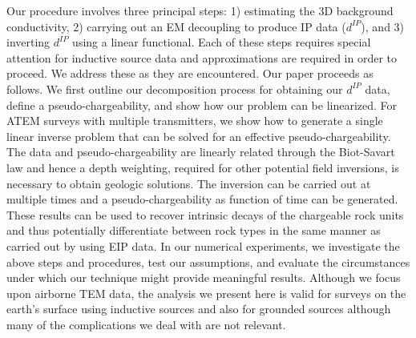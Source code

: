 \documentclass[a4paper, 11pt]{article}
\newcommand{\dip}{d^{IP}}
\begin{document}
Our procedure involves three principal steps: 1) estimating the 3D background conductivity, 2) carrying out an EM decoupling to produce IP data ($\dip$), and 3) inverting $\dip$ using a linear functional. Each of these steps requires special attention for inductive source data and approximations are required in order to proceed. We address these as they are encountered. Our paper proceeds as follows. We first outline our decomposition process for obtaining our $\dip$ data, define a pseudo-chargeability, and  show how our problem can be linearized. For ATEM surveys with multiple transmitters, we show how to generate a single linear inverse problem that can be solved for an effective pseudo-chargeability. The data and  pseudo-chargeability are linearly related through the Biot-Savart law and hence a depth weighting, required for other potential field inversions, is necessary to obtain geologic solutions. The inversion can be carried out at multiple times and a pseudo-chargeability as function of time can be generated. These results can be used to recover intrinsic decays of the chargeable rock units and thus potentially differentiate between rock types in the same manner as carried out by \cite{Yuval1997} using EIP data. In our numerical experiments, we investigate the above steps and procedures, test our assumptions, and evaluate the circumstances under which our technique might provide meaningful results. Although  we focus upon airborne TEM data, the analysis we present here is valid for surveys on the earth’s surface using inductive sources and also for grounded sources although many of the complications we deal with are not relevant. 
    
\end{document}
